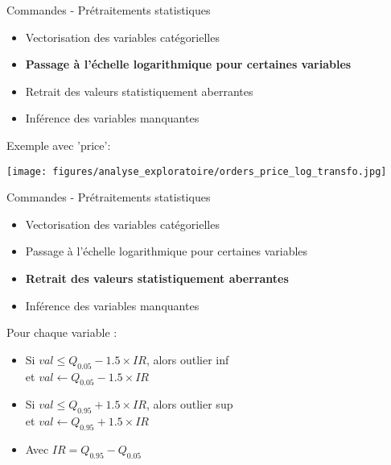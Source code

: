 \documentclass[10pt]{beamer}
\begin{document}
\begin{frame}{Commandes - Prétraitements statistiques}
    \begin{minipage}{0.52\linewidth}
        \begin{itemize}
            \item Vectorisation des variables catégorielles 
            \item \textbf{Passage à l'échelle logarithmique pour certaines variables}
            \item Retrait des valeurs statistiquement aberrantes
            \item Inférence des variables manquantes
        \end{itemize}
    \end{minipage}
    \begin{minipage}{0.45\linewidth}
        Exemple avec 'price':
        \begin{center}
            \texttt{[image: figures/analyse\_exploratoire/orders\_price\_log\_transfo.jpg]}
        \end{center}
    \end{minipage}
\end{frame}
\begin{frame}{Commandes - Prétraitements statistiques}
    \begin{minipage}{0.52\linewidth}
        \begin{itemize}
            \item Vectorisation des variables catégorielles 
            \item Passage à l'échelle logarithmique pour certaines variables
            \item \textbf{Retrait des valeurs statistiquement aberrantes}
            \item Inférence des variables manquantes
        \end{itemize}
    \end{minipage}
    \begin{minipage}{0.45\linewidth}
    Pour chaque variable :
        \begin{itemize}
            \item Si $val \leq Q_{0.05} - 1.5 \times IR$, 
                alors outlier inf\\ et 
                $val \leftarrow Q_{0.05} - 1.5 \times IR$
            \item Si $val \leq Q_{0.95} + 1.5 \times IR$, 
                alors outlier sup \\ et
                $val \leftarrow Q_{0.95} + 1.5 \times IR$
            \item Avec $IR = Q_{0.95} - Q_{0.05}$
        \end{itemize}
    \end{minipage}
\end{frame}
\end{document}
